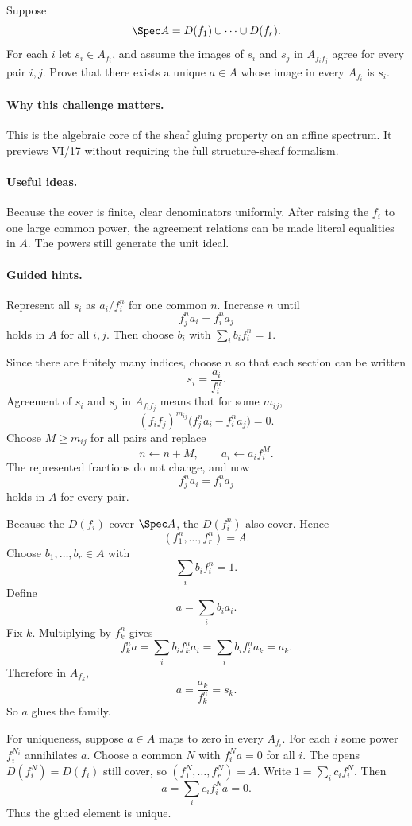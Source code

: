 \begin{problem}
Suppose
\[
\Spec A=D(f_1)\cup\cdots\cup D(f_r).
\]
For each $i$ let $s_i\in A_{f_i}$, and assume the images of $s_i$ and $s_j$ in
$A_{f_if_j}$ agree for every pair $i,j$.  Prove that there exists a unique $a\in A$ whose
image in every $A_{f_i}$ is $s_i$.
\end{problem}

\paragraph{Why this challenge matters.}
This is the algebraic core of the sheaf gluing property on an affine spectrum.  It previews
VI/17 without requiring the full structure-sheaf formalism.

\paragraph{Useful ideas.}
Because the cover is finite, clear denominators uniformly.  After raising the $f_i$ to one
large common power, the agreement relations can be made literal equalities in $A$.  The
powers still generate the unit ideal.

\paragraph{Guided hints.}
Represent all $s_i$ as $a_i/f_i^n$ for one common $n$.  Increase $n$ until
\[
f_j^n a_i=f_i^n a_j
\]
holds in $A$ for all $i,j$.  Then choose $b_i$ with $\sum_i b_if_i^n=1$.

\begin{solution}
Since there are finitely many indices, choose $n$ so that each section can be written
\[
s_i=\frac{a_i}{f_i^n}.
\]
Agreement of $s_i$ and $s_j$ in $A_{f_if_j}$ means that for some $m_{ij}$,
\[
(f_if_j)^{m_{ij}}
\bigl(f_j^n a_i-f_i^n a_j\bigr)=0.
\]
Choose $M\ge m_{ij}$ for all pairs and replace
\[
n\leftarrow n+M,
\qquad
a_i\leftarrow a_i f_i^M.
\]
The represented fractions do not change, and now
\[
f_j^n a_i=f_i^n a_j
\]
holds in $A$ for every pair.

Because the $D(f_i)$ cover $\Spec A$, the $D(f_i^n)$ also cover.  Hence
\[
(f_1^n,\dots,f_r^n)=A.
\]
Choose $b_1,\dots,b_r\in A$ with
\[
\sum_i b_i f_i^n=1.
\]
Define
\[
a=\sum_i b_i a_i.
\]
Fix $k$.  Multiplying by $f_k^n$ gives
\[
f_k^n a
=
\sum_i b_i f_k^n a_i
=
\sum_i b_i f_i^n a_k
=a_k.
\]
Therefore in $A_{f_k}$,
\[
a=\frac{a_k}{f_k^n}=s_k.
\]
So $a$ glues the family.

For uniqueness, suppose $a\in A$ maps to zero in every $A_{f_i}$.  For each $i$ some
power $f_i^{N_i}$ annihilates $a$.  Choose a common $N$ with $f_i^N a=0$ for all $i$.
The opens $D(f_i^N)=D(f_i)$ still cover, so $(f_1^N,\dots,f_r^N)=A$.  Write
$1=\sum_i c_i f_i^N$.  Then
\[
a=\sum_i c_i f_i^N a=0.
\]
Thus the glued element is unique.
\end{solution}

